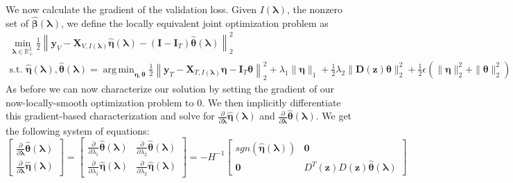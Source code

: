 \documentclass[12pt,letterpaper]{article}
\DeclareMathOperator*{\argmin}{arg\,min}
\begin{document}
We now calculate the gradient of the validation loss. Given $I(\boldsymbol \lambda)$, the nonzero set of $\hat{\boldsymbol{\beta}}(\boldsymbol{\lambda})$, we define the locally equivalent joint optimization problem as
\begin{equation}
\begin{array}{c}
\min_{\boldsymbol\lambda \in \mathbb{R}^2_{+}} \frac{1}{2}
\left \|
\boldsymbol{y}_V
- \boldsymbol{X}_{V, I(\boldsymbol \lambda)} \hat{\boldsymbol{\eta}}(\boldsymbol{\lambda})
- (\boldsymbol{I} - \boldsymbol{I}_T) \hat{\boldsymbol{\theta}}(\boldsymbol{\lambda})
\right \|^2_2 \\
\text{s.t. }
\hat{\boldsymbol{\eta}}(\boldsymbol{\lambda}),
\hat{\boldsymbol{\theta}}(\boldsymbol{\lambda}) =
\argmin_{\boldsymbol \eta, \boldsymbol{\theta}}
\frac{1}{2} \left \|
\boldsymbol{y}_T
- \boldsymbol{X}_{T, I(\boldsymbol \lambda)}\boldsymbol{\eta}
- \boldsymbol{I}_T \boldsymbol{\theta} \right \|^2_2
+ \lambda_1 \| \boldsymbol{\eta} \|_1
+ \frac{1}{2} \lambda_2 \| \boldsymbol{D}(\boldsymbol{z}) \boldsymbol{\theta} \|_2^2
+ \frac{1}{2} \epsilon \left( \| \boldsymbol{\eta} \|_2^2 + \| \boldsymbol{\theta} \|_2^2 \right )
\end{array}
\label{aplmRestricted}
\end{equation}
As before we can now characterize our solution by setting the gradient of our now-locally-smooth optimization problem to $0$. We then implicitly differentiate this gradient-based characterization and solve for $\frac{\partial}{\partial \boldsymbol \lambda} \hat{\boldsymbol\eta}(\boldsymbol{\lambda}) $ and $\frac{\partial}{\partial \boldsymbol \lambda} \hat{\boldsymbol\theta}(\boldsymbol{\lambda})$. We get the following system of equations:
\begin{equation}
\begin{bmatrix}
\frac{\partial}{\partial \boldsymbol{\lambda}} \hat{\boldsymbol\theta}(\boldsymbol{\lambda})\\
\frac{\partial}{\partial \boldsymbol{\lambda}} \hat{\boldsymbol\eta}(\boldsymbol{\lambda})
\end{bmatrix}
=
\begin{bmatrix}
\frac{\partial}{\partial \lambda_1} \hat{\boldsymbol\theta}(\boldsymbol{\lambda}) & \frac{\partial}{\partial \lambda_2} \hat{\boldsymbol\theta}(\boldsymbol{\lambda}) \\
\frac{\partial}{\partial \lambda_1} \hat{\boldsymbol\eta}(\boldsymbol{\lambda}) & \frac{\partial}{\partial \lambda_2} \hat{\boldsymbol\eta}(\boldsymbol{\lambda})
\end{bmatrix}
=
-
H^{-1}
\begin{bmatrix}
sgn \left ( \hat {\boldsymbol \eta} (\boldsymbol \lambda) \right ) & \boldsymbol {0}\\
\boldsymbol {0} & D^T(\boldsymbol z) D(\boldsymbol z) \hat{\boldsymbol \theta} (\boldsymbol \lambda)
\end{bmatrix}
\end{equation}
\end{document}

